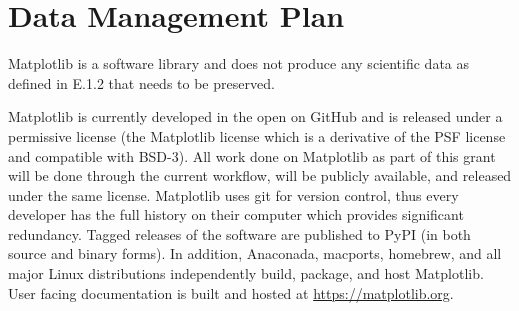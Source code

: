 \documentclass[12pt]{article}
\numberwithin{page}{section}
\begin{document}
\def\sovast{\ref@jnl{Soviet~Ast.}}      %
\def\ssr{\ref@jnl{Space~Sci.~Rev.}}     %
\def\zap{\ref@jnl{ZAp}}                 %
\def\nat{\ref@jnl{Nature}}              %
\def\iaucirc{\ref@jnl{IAU~Circ.}}       %
\def\aplett{\ref@jnl{Astrophys.~Lett.}} %
\def\apspr{\ref@jnl{Astrophys.~Space~Phys.~Res.}}
\def\bain{\ref@jnl{Bull.~Astron.~Inst.~Netherlands}}
\def\fcp{\ref@jnl{Fund.~Cosmic~Phys.}}  %
\def\gca{\ref@jnl{Geochim.~Cosmochim.~Acta}}   %
\def\grl{\ref@jnl{Geophys.~Res.~Lett.}} %
\def\jcp{\ref@jnl{J.~Chem.~Phys.}}      %
\def\jgr{\ref@jnl{J.~Geophys.~Res.}}    %
\def\jqsrt{\ref@jnl{J.~Quant.~Spec.~Radiat.~Transf.}}
\def\memsai{\ref@jnl{Mem.~Soc.~Astron.~Italiana}}
\def\nphysa{\ref@jnl{Nucl.~Phys.~A}}   %
\def\physrep{\ref@jnl{Phys.~Rep.}}   %
\def\physscr{\ref@jnl{Phys.~Scr}}   %
\def\planss{\ref@jnl{Planet.~Space~Sci.}}   %
\def\procspie{\ref@jnl{Proc.~SPIE}}   %

\let\astap=\aap
\let\apjlett=\apjl
\let\apjsupp=\apjs
\let\applopt=\ao
\setcounter{page}{1}


\newpage
\section{Data Management Plan}
\setcounter{page}{1}

Matplotlib is a software library and does not produce any scientific
data as defined in E.1.2 that needs to be preserved.

Matplotlib is currently developed in the open on GitHub and is
released under a permissive license (the Matplotlib license which is a
derivative of the PSF license and compatible with BSD-3).  All work
done on Matplotlib as part of this grant will be done through the
current workflow, will be publicly available, and released under the
same license.  Matplotlib uses git for version control, thus every
developer has the full history on their computer which provides
significant redundancy.  Tagged releases of the software are published
to PyPI (in both source and binary forms).  In addition, Anaconada,
macports, homebrew, and all major Linux distributions independently
build, package, and host Matplotlib.  User facing documentation is built
and hosted at \url{https://matplotlib.org}.
\end{document}
